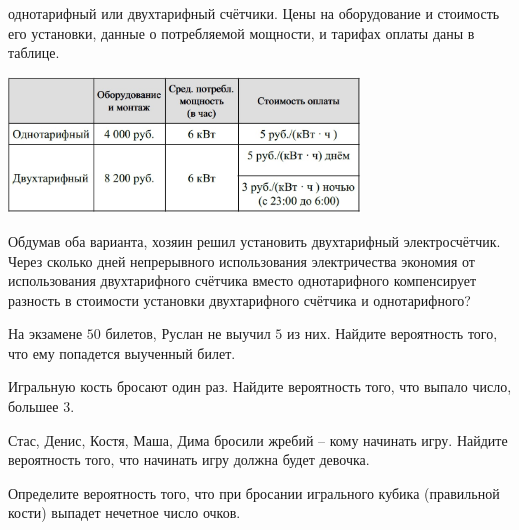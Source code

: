 \begin{homework}[number=1]
\begin{listofex}
		однотарифный или двухтарифный счётчики. Цены на оборудование и стоимость его установки, данные о
		потребляемой мощности, и тарифах оплаты даны в таблице.
		\begin{center}
			\includegraphics[align=t, width=0.7\textwidth]{pics/G91M3H1-2}
		\end{center}
		Обдумав оба варианта, хозяин решил установить двухтарифный электросчётчик. Через сколько дней
		непрерывного использования электричества экономия от использования двухтарифного счётчика вместо
		однотарифного компенсирует разность в стоимости установки двухтарифного счётчика и однотарифного?
		\item На экзамене \( 50 \) билетов, Руслан не выучил \( 5 \) из них. Найдите вероятность того, что ему попадется
		выученный билет.
		\item Игральную кость бросают один раз. Найдите вероятность того, что выпало число, большее \( 3 \).
		\item Стас, Денис, Костя, Маша, Дима бросили жребий -- кому начинать игру. Найдите вероятность того, что
		начинать игру должна будет девочка.
		\item Определите вероятность того, что при бросании игрального кубика (правильной кости) выпадет нечетное
		число очков.
		\item {}
	\end{listofex}
\end{homework}
